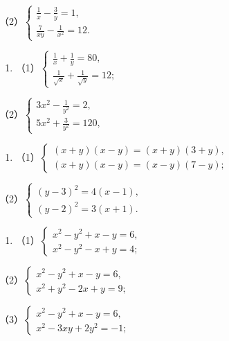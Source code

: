 （2）\(\left\{ \begin{array}{l} \frac{1}{x} - \frac{3}{y} = 1, \\ \frac{7}{xy} - \frac{1}{x^2} = 12. \end{array} \right.\)

\begin{enumerate}[start=3]
\item
  （1）\(\left\{ \begin{array}{l} \frac{1}{x} + \frac{1}{y} = 80, \\ \frac{1}{\sqrt{x}} + \frac{1}{\sqrt{y}} = 12; \end{array} \right.\)
\end{enumerate}

（2）\(\left\{ \begin{array}{l} 3x^{2} - \frac{1}{y^{2}} = 2, \\ 5x^{2} + \frac{3}{y^{2}} = 120, \end{array} \right.\)

\begin{enumerate}[start=4]
\item
  （1）\(\left\{ \begin{array}{l} (x + y)(x - y) = (x + y)(3 + y), \\ (x + y)(x - y) = (x - y)(7 - y); \end{array} \right.\)
\end{enumerate}

（2）\(\left\{ \begin{array}{l} (y - 3)^2 = 4(x - 1), \\ (y - 2)^2 = 3(x + 1). \end{array} \right.\)

\begin{enumerate}[start=5]
\item
  （1）\(\left\{ \begin{array}{l} x^{2} - y^{2} + x - y = 6, \\ x^{2} - y^{2} - x + y = 4; \end{array} \right.\)
\end{enumerate}

（2）\(\left\{ \begin{array}{l} x^{2} - y^{2} + x - y = 6, \\ x^{2} + y^{2} - 2x + y = 9; \end{array} \right.\)

（3）\(\left\{ \begin{array}{l} x^{2} - y^{2} + x - y = 6, \\ x^{2} - 3xy + 2y^{2} = -1; \end{array} \right.\)

